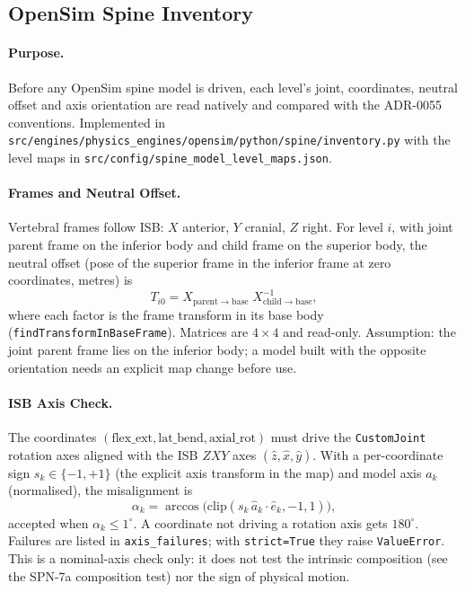 \subsection{OpenSim Spine Inventory}

\paragraph{Purpose.} Before any OpenSim spine model is driven, each level's
joint, coordinates, neutral offset and axis orientation are read natively and
compared with the ADR-0055 conventions. Implemented in
\texttt{src/engines/physics\_engines/opensim/python/spine/inventory.py} with the
level maps in \texttt{src/config/spine\_model\_level\_maps.json}.

\paragraph{Frames and Neutral Offset.} Vertebral frames follow ISB: $X$
anterior, $Y$ cranial, $Z$ right. For level $i$, with joint parent frame on the
inferior body and child frame on the superior body, the neutral offset (pose
of the superior frame in the inferior frame at zero coordinates, metres) is
\begin{equation}
  T_{i0} = X_{\mathrm{parent}\to\mathrm{base}}\; X_{\mathrm{child}\to\mathrm{base}}^{-1},
\end{equation}
where each factor is the frame transform in its base body
(\texttt{findTransformInBaseFrame}). Matrices are $4\times4$ and read-only.
Assumption: the joint parent frame lies on the inferior body; a model built
with the opposite orientation needs an explicit map change before use.

\paragraph{ISB Axis Check.} The coordinates $(\mathrm{flex\_ext},
\mathrm{lat\_bend}, \mathrm{axial\_rot})$ must drive the \texttt{CustomJoint}
rotation axes aligned with the ISB $ZXY$ axes $(\hat z,\hat x,\hat y)$. With a
per-coordinate sign $s_k\in\{-1,+1\}$ (the explicit axis transform in the map)
and model axis $a_k$ (normalised), the misalignment is
\begin{equation}
  \alpha_k = \arccos\!\big(\mathrm{clip}(s_k\,\hat a_k\cdot \hat e_k,-1,1)\big),
\end{equation}
accepted when $\alpha_k\le 1^\circ$. A coordinate not driving a rotation axis
gets $180^\circ$. Failures are listed in \texttt{axis\_failures}; with
\texttt{strict=True} they raise \texttt{ValueError}. This is a nominal-axis
check only: it does not test the intrinsic composition (see the SPN-7a
composition test) nor the sign of physical motion.

